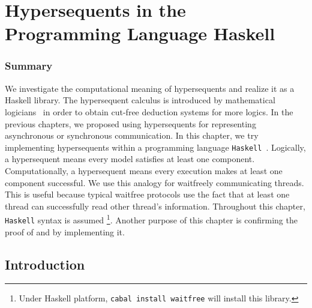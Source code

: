 \chapter{Hypersequents in the Programming Language Haskell}
\label{ch:haskell}

\subsection{Summary}

 We investigate the computational meaning of hypersequents and realize
 it as a Haskell library.
 The hypersequent calculus is introduced by mathematical
 logicians~\citep{avron91,alg,metcalfe2006} in order
 to obtain cut-free deduction systems for more logics.
 In the previous chapters, we proposed using hypersequents
 for representing asynchronous or synchronous communication.
 In this chapter, we try implementing hypersequents within a programming
 language \texttt{Haskell}~\citep{marlow2010haskell}.
 Logically, a hypersequent
 means every model satisfies at least one component.
 Computationally, a hypersequent
 means every execution makes at least one component
 successful.
 We use this analogy
 for waitfreely communicating threads.  This is useful
 because typical waitfree protocols use the fact that at least one thread
 can successfully read other thread's information.
 Throughout this chapter, \texttt{Haskell} syntax is assumed%
 \footnote{Under Haskell platform,
 \texttt{cabal install waitfree} will install this library.}.
 Another purpose of this chapter is confirming the proof of
  and  by implementing it.

\iffalse
\begin{code}
 {-# LANGUAGE TypeOperators, MultiParamTypeClasses, FunctionalDependencies, FlexibleInstances, UndecidableInstances #-}

module Control.Concurrent.Waitfree
    ( ZeroT
    , SucT
    , HNil
    , HCons
    , (:*:)
    , K
    , single
    , Thread (t, atid)
    , AbstractThreadId
    , peek
    , comm
    , follows
    , execute
    , choice
    , cycling
    , exchange
    , (-*-)
    )
    where

import Control.Concurrent (ThreadId, forkIO, killThread)
import Control.Concurrent.MVar (MVar, tryPutMVar, readMVar,
 newEmptyMVar, tryTakeMVar)
import qualified Data.Map as Map
\end{code}
\fi

\section{Introduction}


